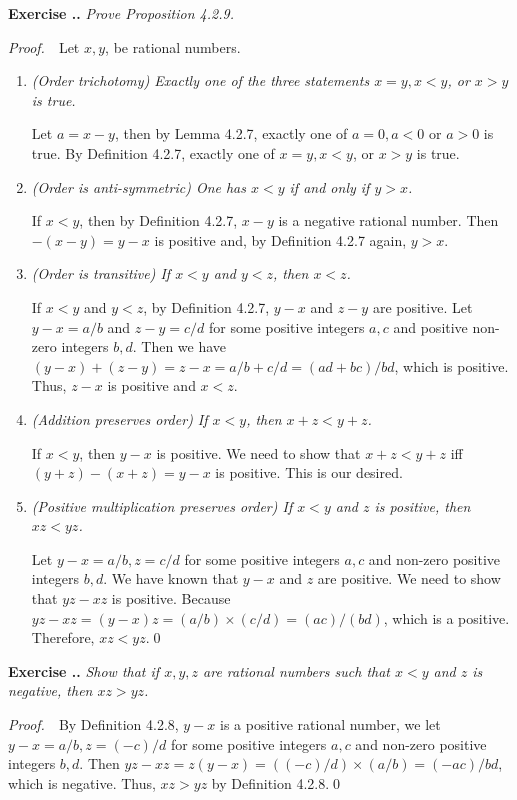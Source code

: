 \documentclass{book}
\newcommand{\pff}{\vspace{.25em}\noindent\emph{Proof.}~~}
\newcounter{Exercise}[section]
\renewcommand{\theExercise}{\thesection.\arabic{Exercise}.}
\newcommand{\new}{\vspace{1.5em}\noindent\textbf{{Exercise \stepcounter{Exercise}\textbf{\theExercise}}} }
\begin{document}
\new\emph{Prove Proposition 4.2.9.}

\pff Let $x,y$, be rational numbers.
\begin{enumerate}
    \item \emph{(Order trichotomy) Exactly one of the three statements $x=y,x<y$, or $x>y$ is true.}

    Let $a=x-y$, then by Lemma 4.2.7, exactly one of $a=0, a<0$ or $a>0$ is true. By Definition 4.2.7, exactly one of $x=y,x<y$, or $x>y$ is true.

    \item \emph{(Order is anti-symmetric) One has $x<y$ if and only if $y>x$.}

    If $x<y$, then by Definition 4.2.7, $x-y$ is a negative rational number. Then $-(x-y)=y-x$ is positive and, by Definition 4.2.7 again, $y>x$. 

    \item \emph{(Order is transitive) If $x<y$ and $y<z$, then $x<z$.}

    If $x<y$ and $y<z$, by Definition 4.2.7, $y-x$ and $z-y$ are positive. Let $y-x=a/b$ and $z-y=c/d$ for some positive integers $a,c$ and positive non-zero integers $b,d$. Then we have $(y-x)+(z-y)=z-x=a/b+c/d=(ad+bc)/bd$, which is positive. Thus, $z-x$ is positive and $x<z$.

    \item \emph{(Addition preserves order) If $x<y$, then $x+z<y+z$.}

    If $x<y$, then $y-x$ is positive. We need to show that $x+z<y+z$ iff $(y+z)-(x+z)=y-x$ is positive. This is our desired.

    \item \emph{(Positive multiplication preserves order) If $x<y$ and $z$ is positive, then $xz<yz$.}

    Let $y-x=a/b,z=c/d$ for some positive integers $a,c$ and non-zero positive integers $b,d$. We have known that $y-x$ and $z$ are positive. We need to show that $yz-xz$ is positive. Because $yz-xz=(y-x)z=(a/b)\times(c/d)=(ac)/(bd)$, which is a positive. Therefore, $xz<yz$.\qed
\end{enumerate}

\new\emph{Show that if $x,y,z$ are rational numbers such that $x<y$ and $z$ is negative, then $xz>yz$.}

\pff By Definition 4.2.8, $y-x$ is a positive rational number, we let $y-x=a/b,z=(-c)/d$ for some positive integers $a,c$ and non-zero positive integers $b,d$. Then $yz-xz=z(y-x)=((-c)/d)\times(a/b)=(-ac)/bd$, which is negative. Thus, $xz>yz$ by Definition 4.2.8.\qed
\end{document}
